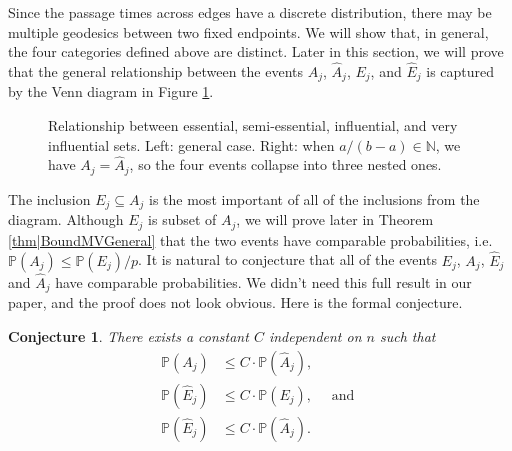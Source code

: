 \documentclass[reqno]{amsart}
\newtheorem{conjecture}{Conjecture}
\begin{document}
Since the passage times across edges have a discrete distribution, there may be multiple geodesics between two fixed endpoints. We will show that, in general, the four categories defined above are distinct. Later in this section, we will prove that the general relationship between the events $A_j$, $\hat A_j$, $E_j$, and $\hat E_j$ is captured by the Venn diagram in Figure \ref{fig|relationshipBetweenAE}. 

\begin{figure}[t]
\centering
{}
\caption{Relationship between essential, semi-essential, influential, and very influential sets. Left: general case. Right: when $a/(b-a)\in\mathbb N$, we have $A_j=\hat A_j$, so the four events collapse into three nested ones.}
\label{fig|relationshipBetweenAE}
\end{figure}

The inclusion $E_j\subseteq A_j$ is the most important of all of the inclusions from the diagram. Although $E_j$ is subset of $A_j$, we will prove later in Theorem \ref{thm|BoundMVGeneral} that 
the two events have comparable probabilities, i.e. $\mathbb P(A_j)\leq \mathbb P(E_j)/p$. It is natural to conjecture that all of the events $E_j$, $A_j$, $\hat E_j$ and $\hat A_j$ have comparable probabilities. We didn't need
this full result in our paper, and the proof does not look obvious. Here is the formal conjecture.  

\begin{conjecture} There exists a constant $C$ independent on $n$ such that 
\begin{align*}\mathbb P(A_j)&\leq C\cdot \mathbb P(\hat A_j),\\
\mathbb P(\hat E_j)&\leq C\cdot \mathbb P(E_j),
\quad\text{ and }\\ \mathbb P(\hat E_j)&\leq C\cdot \mathbb P(\hat A_j).
\end{align*}
\end{conjecture}
\end{document}
